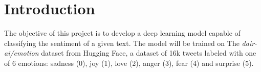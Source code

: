 \section{Introduction}
The objective of this project is to develop a deep learning model capable of classifying the sentiment of a given text.
The model will be trained on The \textit{dair-ai/emotion} dataset from Hugging Face, a dataset of 16k tweets labeled with one of 6 emotions: sadness (0), joy (1), love (2), anger (3), fear (4) and surprise (5).